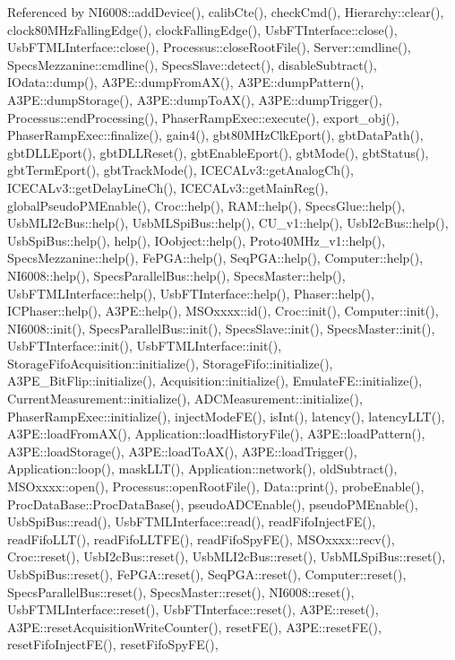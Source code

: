 Referenced by N\+I6008\+::add\+Device(), calib\+Cte(), check\+Cmd(), Hierarchy\+::clear(), clock80\+M\+Hz\+Falling\+Edge(), clock\+Falling\+Edge(), Usb\+F\+T\+Interface\+::close(), Usb\+F\+T\+M\+L\+Interface\+::close(), Processus\+::close\+Root\+File(), Server\+::cmdline(), Specs\+Mezzanine\+::cmdline(), Specs\+Slave\+::detect(), disable\+Subtract(), I\+Odata\+::dump(), A3\+P\+E\+::dump\+From\+A\+X(), A3\+P\+E\+::dump\+Pattern(), A3\+P\+E\+::dump\+Storage(), A3\+P\+E\+::dump\+To\+A\+X(), A3\+P\+E\+::dump\+Trigger(), Processus\+::end\+Processing(), Phaser\+Ramp\+Exec\+::execute(), export\+\_\+obj(), Phaser\+Ramp\+Exec\+::finalize(), gain4(), gbt80\+M\+Hz\+Clk\+Eport(), gbt\+Data\+Path(), gbt\+D\+L\+L\+Eport(), gbt\+D\+L\+L\+Reset(), gbt\+Enable\+Eport(), gbt\+Mode(), gbt\+Status(), gbt\+Term\+Eport(), gbt\+Track\+Mode(), I\+C\+E\+C\+A\+Lv3\+::get\+Analog\+Ch(), I\+C\+E\+C\+A\+Lv3\+::get\+Delay\+Line\+Ch(), I\+C\+E\+C\+A\+Lv3\+::get\+Main\+Reg(), global\+Pseudo\+P\+M\+Enable(), Croc\+::help(), R\+A\+M\+::help(), Specs\+Glue\+::help(), Usb\+M\+L\+I2c\+Bus\+::help(), Usb\+M\+L\+Spi\+Bus\+::help(), C\+U\+\_\+v1\+::help(), Usb\+I2c\+Bus\+::help(), Usb\+Spi\+Bus\+::help(), help(), I\+Oobject\+::help(), Proto40\+M\+Hz\+\_\+v1\+::help(), Specs\+Mezzanine\+::help(), Fe\+P\+G\+A\+::help(), Seq\+P\+G\+A\+::help(), Computer\+::help(), N\+I6008\+::help(), Specs\+Parallel\+Bus\+::help(), Specs\+Master\+::help(), Usb\+F\+T\+M\+L\+Interface\+::help(), Usb\+F\+T\+Interface\+::help(), Phaser\+::help(), I\+C\+Phaser\+::help(), A3\+P\+E\+::help(), M\+S\+Oxxxx\+::id(), Croc\+::init(), Computer\+::init(), N\+I6008\+::init(), Specs\+Parallel\+Bus\+::init(), Specs\+Slave\+::init(), Specs\+Master\+::init(), Usb\+F\+T\+Interface\+::init(), Usb\+F\+T\+M\+L\+Interface\+::init(), Storage\+Fifo\+Acquisition\+::initialize(), Storage\+Fifo\+::initialize(), A3\+P\+E\+\_\+\+Bit\+Flip\+::initialize(), Acquisition\+::initialize(), Emulate\+F\+E\+::initialize(), Current\+Measurement\+::initialize(), A\+D\+C\+Measurement\+::initialize(), Phaser\+Ramp\+Exec\+::initialize(), inject\+Mode\+F\+E(), is\+Int(), latency(), latency\+L\+L\+T(), A3\+P\+E\+::load\+From\+A\+X(), Application\+::load\+History\+File(), A3\+P\+E\+::load\+Pattern(), A3\+P\+E\+::load\+Storage(), A3\+P\+E\+::load\+To\+A\+X(), A3\+P\+E\+::load\+Trigger(), Application\+::loop(), mask\+L\+L\+T(), Application\+::network(), old\+Subtract(), M\+S\+Oxxxx\+::open(), Processus\+::open\+Root\+File(), Data\+::print(), probe\+Enable(), Proc\+Data\+Base\+::\+Proc\+Data\+Base(), pseudo\+A\+D\+C\+Enable(), pseudo\+P\+M\+Enable(), Usb\+Spi\+Bus\+::read(), Usb\+F\+T\+M\+L\+Interface\+::read(), read\+Fifo\+Inject\+F\+E(), read\+Fifo\+L\+L\+T(), read\+Fifo\+L\+L\+T\+F\+E(), read\+Fifo\+Spy\+F\+E(), M\+S\+Oxxxx\+::recv(), Croc\+::reset(), Usb\+I2c\+Bus\+::reset(), Usb\+M\+L\+I2c\+Bus\+::reset(), Usb\+M\+L\+Spi\+Bus\+::reset(), Usb\+Spi\+Bus\+::reset(), Fe\+P\+G\+A\+::reset(), Seq\+P\+G\+A\+::reset(), Computer\+::reset(), Specs\+Parallel\+Bus\+::reset(), Specs\+Master\+::reset(), N\+I6008\+::reset(), Usb\+F\+T\+M\+L\+Interface\+::reset(), Usb\+F\+T\+Interface\+::reset(), A3\+P\+E\+::reset(), A3\+P\+E\+::reset\+Acquisition\+Write\+Counter(), reset\+F\+E(), A3\+P\+E\+::reset\+F\+E(), reset\+Fifo\+Inject\+F\+E(), reset\+Fifo\+Spy\+F\+E(), 